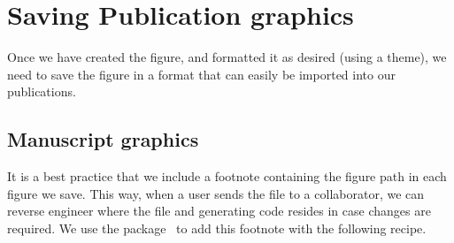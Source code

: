 \documentclass[nojss]{jss}\usepackage[]{graphicx}\usepackage[]{color}
\begin{document}
\section{Saving Publication graphics}\label{S:saving}

Once we have created the figure, and formatted it as desired (using a  theme), we need to save the figure in a format that can easily be imported into our publications. 

\subsection{Manuscript graphics}

It is a best practice that we include a footnote containing the figure path in each figure we save. This way, when a user sends the file to a collaborator, we can reverse engineer where the file and generating code resides in case changes are required. We use the  package~\citep{Auguie:2012} to add this footnote with the following recipe.
\end{document}
